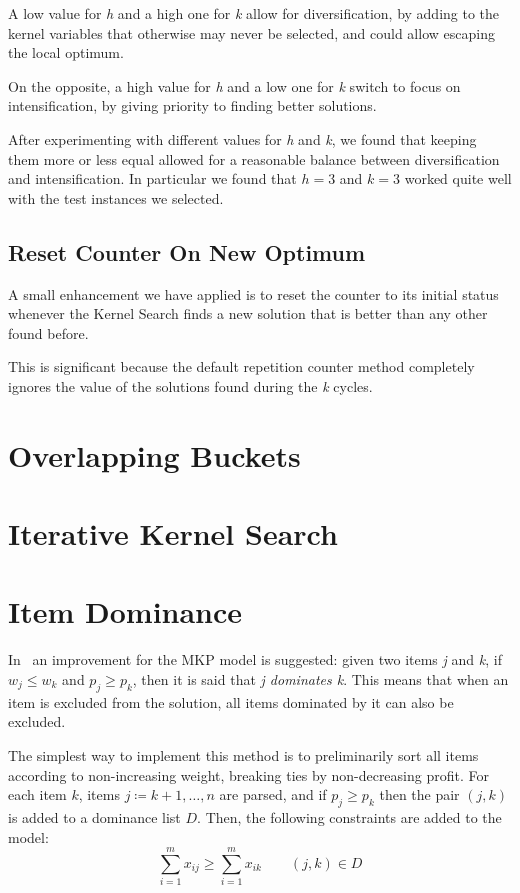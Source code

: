 A low value for \textit{h} and a high one for \textit{k} allow for
diversification, by adding to the kernel variables that otherwise
may never be selected, and could allow escaping the local optimum.

On the opposite, a high value for \textit{h} and a low one for \textit{k}
switch to focus on intensification, by giving priority to finding
better solutions.

After experimenting with different values for \textit{h} and \textit{k},
we found that keeping them more or less equal allowed for
a reasonable balance between diversification and intensification.
In particular we found that \(h=3\) and \(k=3\) worked quite well
with the test instances we selected.

\subsection{Reset Counter On New Optimum}
A small enhancement we have applied is to reset the counter to its initial status
whenever the Kernel Search finds a new solution
that is better than any other found before.

This is significant because the default repetition counter
method completely ignores the value of the solutions found
during the \textit{k} cycles.


\section{Overlapping Buckets}


\section{Iterative Kernel Search}


\section{Item Dominance}
In~\cite{mkp:2019} an improvement for the MKP model is suggested:
given two items \textit{j} and \textit{k}, if \(w_{j} \leq w_{k}\)
and \(p_{j} \geq p_{k}\), then it is said that \textit{j dominates k}.
This means that when an item is excluded from the solution,
all items dominated by it can also be excluded.

The simplest way to implement this method is to preliminarily sort all
items according to non-increasing weight, breaking ties by
non-decreasing profit.
For each item \(k\), items \(j \coloneqq k+1,\dots,n\) are parsed,
and if \(p_{j} \geq p_{k}\) then the pair \((j,k)\) is added to a
dominance list \(D\).
Then, the following constraints are added to the model:
\begin{equation}
    \label{eq:itemdom}
    \sum_{i=1}^{m} x_{ij} \geq \sum_{i=1}^{m} x_{ik} \qquad (j,k) \in D
\end{equation}

